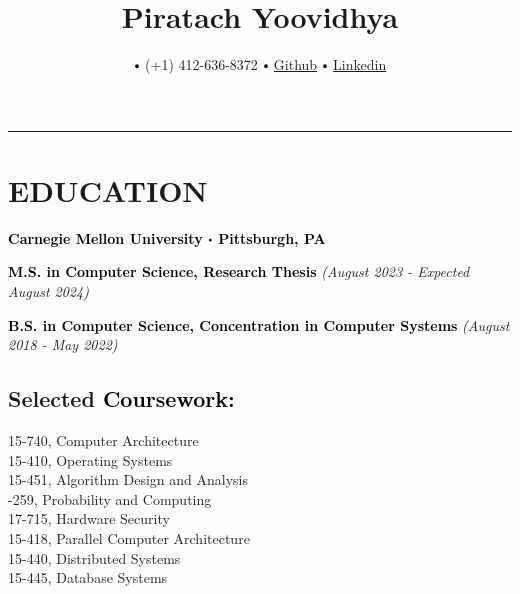 \documentclass[10pt]{article}
\title{\bfseries\Huge Piratach Yoovidhya}
\author{
  \small \myemail
   $\sbullet[.75]$
   (+1) 412-636-8372
   $\sbullet[.75]$
  \href{https://github.com/Piratach}{Github}
   $\sbullet[.75]$
  \href{https://www.linkedin.com/in/piratach-yoovidhya/}
{Linkedin}
}
\date{}
\newcommand\sbullet[1][.5]{\mathbin{\vcenter{\hbox{\scalebox{#1}{$\bullet$}}}}}
\begin{document}
  \maketitle
  \thispagestyle{empty}
  \vspace*{-1.0cm}
  \hrule
  \vspace*{-0.15cm}

  \section*{\large \textcolor{lighterB}{EDUCATION}}
  \vspace*{-0.3cm}

  \textbf{\large \textcolor{Black}{Carnegie Mellon University $\sbullet$ Pittsburgh, PA}}

  \vspace{0.05cm}

\textcolor{Black}{\textbf{M.S. in Computer Science, Research Thesis}} \hfill \textit{(August 2023 - Expected August 2024)}

  \vspace{0.05cm}

\textcolor{Black}{\textbf{B.S. in Computer Science, Concentration in Computer Systems}} \hfill \textit{(August 2018 - May 2022)}

  \vspace{0.2cm}

  \vspace*{-0.5cm}

  \subsection*{Selected \textcolor{Black}{Coursework:}}

    \vspace*{-0.55cm}
    \begin{multicols}{2}
       15-740, Computer Architecture \\
       15-410, Operating Systems \\
       15-451, Algorithm Design and Analysis \\
       -259, Probability and Computing \\
       17-715, Hardware Security \\
       15-418, Parallel Computer Architecture \\
       15-440, Distributed Systems \\
       15-445, Database Systems
    \end{multicols}
\end{document}
